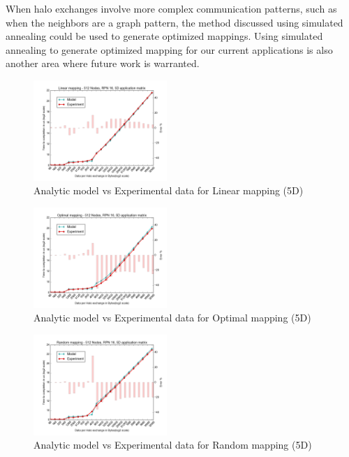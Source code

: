 \documentclass{acm_proc_article-sp}
\begin{document}
When halo exchanges involve more complex communication patterns, such as when the neighbors
are a graph pattern, the method discussed using simulated annealing could be used to generate
optimized mappings. Using simulated annealing to generate optimized mapping for our current applications
is also another area where future work is warranted.


\begin{figure}
  \center
  \includegraphics[width=0.45\textwidth]{mappings/5d_linear_model.png}
  \caption{Analytic model vs Experimental data for Linear mapping (5D)}
    \label{fig:5D_linear_mapping}
\end{figure}


\begin{figure}
  \center
  \includegraphics[width=0.45\textwidth]{mappings/5d_optimal_model.png}
  \caption{Analytic model vs Experimental data for Optimal mapping (5D)}
    \label{fig:5D_optimal_mapping}
\end{figure}

\begin{figure}
  \center
  \includegraphics[width=0.45\textwidth]{mappings/5d_random_model.png}
  \caption{Analytic model vs Experimental data for Random mapping (5D)}
    \label{fig:5D_random_mapping}
\end{figure}
\end{document}
